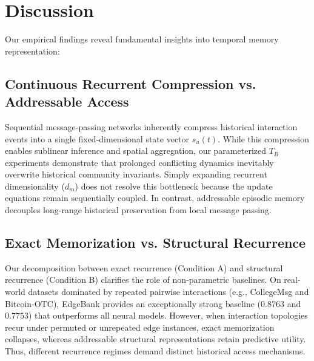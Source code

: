\section{Discussion}
\label{sec:discussion}

Our empirical findings reveal fundamental insights into temporal memory representation:

\subsection{Continuous Recurrent Compression vs. Addressable Access}
Sequential message-passing networks inherently compress historical interaction events into a single fixed-dimensional state vector $s_u(t)$. While this compression enables sublinear inference and spatial aggregation, our parameterized $T_B$ experiments demonstrate that prolonged conflicting dynamics inevitably overwrite historical community invariants. Simply expanding recurrent dimensionality ($d_m$) does not resolve this bottleneck because the update equations remain sequentially coupled. In contrast, addressable episodic memory decouples long-range historical preservation from local message passing.

\subsection{Exact Memorization vs. Structural Recurrence}
Our decomposition between exact recurrence (Condition A) and structural recurrence (Condition B) clarifies the role of non-parametric baselines. On real-world datasets dominated by repeated pairwise interactions (e.g., CollegeMsg and Bitcoin-OTC), EdgeBank provides an exceptionally strong baseline ($0.8763$ and $0.7753$) that outperforms all neural models. However, when interaction topologies recur under permuted or unrepeated edge instances, exact memorization collapses, whereas addressable structural representations retain predictive utility. Thus, different recurrence regimes demand distinct historical access mechanisms.
